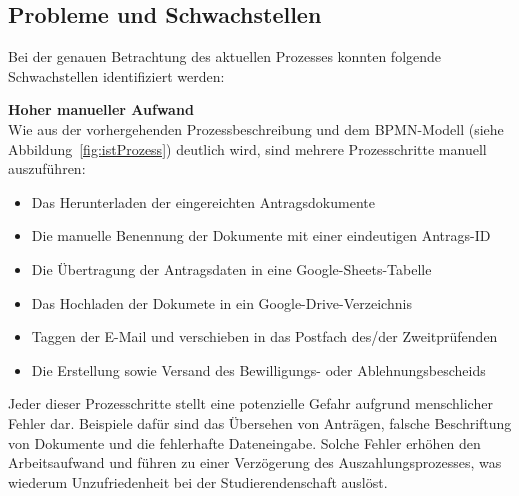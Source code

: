 \subsection{Probleme und Schwachstellen}\label{sec:Probleme_und_Schwachstellen}
Bei der genauen Betrachtung des aktuellen Prozesses konnten folgende Schwachstellen identifiziert werden: 

\textbf{Hoher manueller Aufwand}\\
Wie aus der vorhergehenden Prozessbeschreibung und dem BPMN-Modell (siehe Abbildung~\ref{fig:istProzess}) deutlich wird, sind mehrere Prozesschritte manuell auszuführen:
    \begin{itemize}
    \item Das Herunterladen der eingereichten Antragsdokumente
    \item Die manuelle Benennung der Dokumente mit einer eindeutigen Antrags-ID
    \item Die Übertragung der Antragsdaten in eine Google-Sheets-Tabelle
    \item Das Hochladen der Dokumete in ein Google-Drive-Verzeichnis
    \item Taggen der E-Mail und verschieben in das Postfach des/der Zweitprüfenden
    \item Die Erstellung sowie Versand des Bewilligungs- oder Ablehnungsbescheids
    \end{itemize}
Jeder dieser Prozesschritte stellt eine potenzielle Gefahr aufgrund menschlicher Fehler dar. Beispiele dafür sind das Übersehen von Anträgen, falsche Beschriftung von Dokumente und die fehlerhafte Dateneingabe. Solche Fehler erhöhen den Arbeitsaufwand und führen zu einer Verzögerung des Auszahlungsprozesses, was wiederum Unzufriedenheit bei der Studierendenschaft auslöst. 

